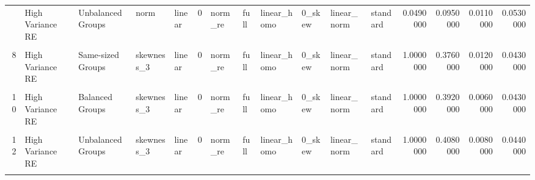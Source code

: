 \documentclass[12pt]{article}
\begin{document}
\begin{table}
{\begin{tabular}[t]{rllllrllllllrrrr}
\addlinespace
6 & High Variance RE & Unbalanced Groups & norm & linear & 0 & norm\_re & full & linear\_homo & 0\_skew & linear\_norm & standard & 0.0490000 & 0.0950000 & 0.0110000 & 0.0530000\\
\cellcolor{gray!6}{7} & \cellcolor{gray!6}{High Variance Error} & \cellcolor{gray!6}{Same-sized Groups} & \cellcolor{gray!6}{skewness\_3} & \cellcolor{gray!6}{linear} & \cellcolor{gray!6}{0} & \cellcolor{gray!6}{norm\_re} & \cellcolor{gray!6}{full} & \cellcolor{gray!6}{linear\_homo} & \cellcolor{gray!6}{0\_skew} & \cellcolor{gray!6}{linear\_norm} & \cellcolor{gray!6}{standard} & \cellcolor{gray!6}{1.0000000} & \cellcolor{gray!6}{0.9880000} & \cellcolor{gray!6}{0.0880000} & \cellcolor{gray!6}{0.0420000}\\
8 & High Variance RE & Same-sized Groups & skewness\_3 & linear & 0 & norm\_re & full & linear\_homo & 0\_skew & linear\_norm & standard & 1.0000000 & 0.3760000 & 0.0120000 & 0.0430000\\
\cellcolor{gray!6}{9} & \cellcolor{gray!6}{High Variance Error} & \cellcolor{gray!6}{Balanced Groups} & \cellcolor{gray!6}{skewness\_3} & \cellcolor{gray!6}{linear} & \cellcolor{gray!6}{0} & \cellcolor{gray!6}{norm\_re} & \cellcolor{gray!6}{full} & \cellcolor{gray!6}{linear\_homo} & \cellcolor{gray!6}{0\_skew} & \cellcolor{gray!6}{linear\_norm} & \cellcolor{gray!6}{standard} & \cellcolor{gray!6}{1.0000000} & \cellcolor{gray!6}{0.9900000} & \cellcolor{gray!6}{0.1010000} & \cellcolor{gray!6}{0.0410000}\\
10 & High Variance RE & Balanced Groups & skewness\_3 & linear & 0 & norm\_re & full & linear\_homo & 0\_skew & linear\_norm & standard & 1.0000000 & 0.3920000 & 0.0060000 & 0.0430000\\
\addlinespace
\cellcolor{gray!6}{11} & \cellcolor{gray!6}{High Variance Error} & \cellcolor{gray!6}{Unbalanced Groups} & \cellcolor{gray!6}{skewness\_3} & \cellcolor{gray!6}{linear} & \cellcolor{gray!6}{0} & \cellcolor{gray!6}{norm\_re} & \cellcolor{gray!6}{full} & \cellcolor{gray!6}{linear\_homo} & \cellcolor{gray!6}{0\_skew} & \cellcolor{gray!6}{linear\_norm} & \cellcolor{gray!6}{standard} & \cellcolor{gray!6}{1.0000000} & \cellcolor{gray!6}{0.9760000} & \cellcolor{gray!6}{0.1000000} & \cellcolor{gray!6}{0.0430000}\\
12 & High Variance RE & Unbalanced Groups & skewness\_3 & linear & 0 & norm\_re & full & linear\_homo & 0\_skew & linear\_norm & standard & 1.0000000 & 0.4080000 & 0.0080000 & 0.0440000\\
\cellcolor{gray!6}{13} & \cellcolor{gray!6}{High Variance Error} & \cellcolor{gray!6}{Same-sized Groups} & \cellcolor{gray!6}{skewness\_1.5} & \cellcolor{gray!6}{linear} & \cellcolor{gray!6}{0} & \cellcolor{gray!6}{norm\_re} & \cellcolor{gray!6}{full} & \cellcolor{gray!6}{linear\_homo} & \cellcolor{gray!6}{0\_skew} & \cellcolor{gray!6}{linear\_norm} & \cellcolor{gray!6}{standard} & \cellcolor{gray!6}{1.0000000} & \cellcolor{gray!6}{0.8500000} & \cellcolor{gray!6}{0.0960000} & \cellcolor{gray!6}{0.0590000}\\

\end{tabular}}
\end{table}
\end{document}
